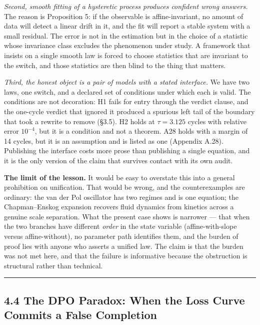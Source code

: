 \documentclass[11pt,a4paper]{article}
\begin{document}
\emph{Second, smooth fitting of a hysteretic process produces confident wrong answers.}
The reason is Proposition 5: if the observable is affine-invariant, no amount of
data will detect a linear drift in it, and the fit will report a stable system with
a small residual. The error is not in the estimation but in the choice of a
statistic whose invariance class excludes the phenomenon under study. A framework
that insists on a single smooth law is forced to choose statistics that are
invariant to the switch, and those statistics are then blind to the thing that
matters.

\emph{Third, the honest object is a pair of models with a stated interface.} We have two
laws, one switch, and a declared set of conditions under which each is valid. The
conditions are not decoration: H1 fails for entry through the verdict clause, and the
one-cycle verdict that ignored it produced a spurious left tail of the boundary
that took a rewrite to remove (§3.5). H2 holds at \(\tau=3.125\) cycles with relative
error \(10^{-4}\), but it is a condition and not a theorem. A28 holds with a margin
of 14 cycles, but it is an assumption and is listed as one (Appendix A.28).
Publishing the interface costs more prose than publishing a single equation, and
it is the only version of the claim that survives contact with its own audit.

\textbf{The limit of the lesson.} It would be easy to overstate this into a general
prohibition on unification. That would be wrong, and the counterexamples are
ordinary: the van der Pol oscillator \cite{vanderpol1926} has two regimes and is
one equation; the
Chapman--Enskog expansion recovers fluid dynamics from kinetics across a genuine
scale separation. What the present case shows is narrower --- that when the two
branches have different \emph{order} in the state variable (affine-with-slope versus
affine-without), no parameter path identifies them, and the burden of proof lies
with anyone who asserts a unified law. The claim is that the burden was not met
here, and that the failure is informative because the obstruction is structural
rather than technical.

\begin{center}\rule{0.5\linewidth}{0.5pt}\end{center}

\subsection{4.4 The DPO Paradox: When the Loss Curve Commits a False Completion}\label{the-dpo-paradox-when-the-loss-curve-commits-a-false-completion}
\end{document}
